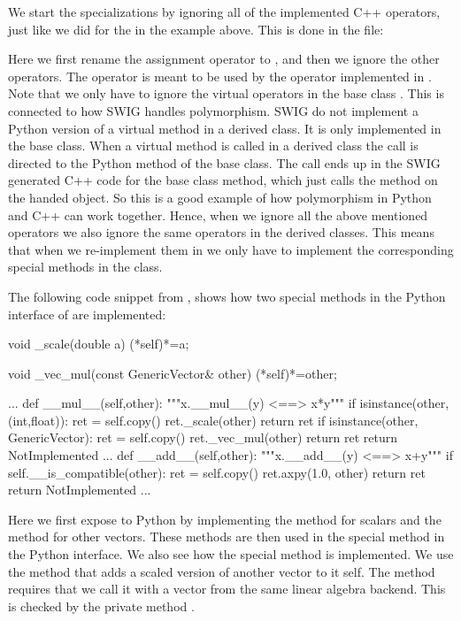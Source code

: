 We start the specializations by ignoring all of the implemented C++ operators, just like we did for the  in the  example above. This is done in the  file:
\begin{c++}
\end{c++}
Here we first rename the assignment operator to , and then we ignore the other operators. The  operator is meant to be used by the  operator implemented in . Note that we only have to ignore the virtual operators in the base class . This is connected to how SWIG handles polymorphism. SWIG do not implement a Python version of a virtual method in a derived class. It is only implemented in the base class. When a virtual method is called in a derived class the call is directed to the Python method of the base class. The call ends up in the SWIG generated C++ code for the base class method, which just calls the method on the handed object. So this is a good example of how polymorphism in Python and C++ can work together. Hence, when we ignore all the above mentioned operators we also ignore the same operators in the derived classes. This means that when we re-implement them in  we only have to implement the corresponding special methods in the  class.

The following code snippet from , shows how two special methods in the Python interface of  are implemented:
\begin{c++}
  void _scale(double a)
  {(*self)*=a;}

  void _vec_mul(const GenericVector& other)
  {(*self)*=other;}

   ...
    def __mul__(self,other):
        """x.__mul__(y) <==> x*y"""
        if isinstance(other,(int,float)):
            ret = self.copy()
            ret._scale(other)
            return ret
        if isinstance(other, GenericVector):
            ret = self.copy()
            ret._vec_mul(other)
            return ret
        return NotImplemented
    ...
    def __add__(self,other):
        """x.__add__(y) <==> x+y"""
        if self.__is_compatible(other):
            ret = self.copy()
            ret.axpy(1.0, other)
            return ret
        return NotImplemented
   ...
\end{c++}
Here we first expose  to Python by implementing the  method for scalars and the  method for other vectors. These methods are then used in the  special method in the Python interface. We also see how the  special method is implemented. We use the  method that adds a scaled version of another vector to it self. The  method requires that we call it with a vector from the same linear algebra backend. This is checked by the private method .

